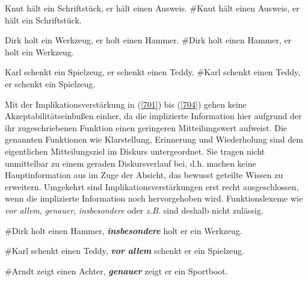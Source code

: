 \begin{exe}
	\ex\label{706} 
		\begin{xlist}	
			\ex\label{706a} Knut hält ein Schriftstück, er hält einen Ausweis.
			\ex\label{706b} \#Knut hält einen Ausweis, er hält ein Schriftstück.
		\end{xlist}
\end{exe}

\begin{exe}
	\ex\label{707} 
		\begin{xlist}	
			\ex\label{707a} Dirk holt ein Werkzeug, er holt einen Hammer.
			\ex\label{707b} \#Dirk holt einen Hammer, er holt ein Werkzeug.
		\end{xlist}
\end{exe}

\begin{exe}
	\ex\label{708} 
		\begin{xlist}	
			\ex\label{708a} Karl schenkt ein Spielzeug, er schenkt einen Teddy.
			\ex\label{708b} \#Karl schenkt einen Teddy, er schenkt ein Spielzeug.
		\end{xlist}
\end{exe}	
Mit der Implikationsverstärkung in (\ref{701}) bis (\ref{704}) gehen keine Akzeptabilitätseinbußen einher, da die implizierte Information hier aufgrund der ihr zugeschriebenen Funktion einen geringeren Mitteilungswert aufweist. Die genannten Funktionen wie Klarstellung, Erinnerung und Wiederholung sind dem eigentlichen Mitteilungsziel im Diskurs untergeordnet. Sie tragen nicht unmittelbar zu einem geraden Diskursverlauf bei, d.h. machen keine Hauptinformation aus im Zuge der Absicht, das bewusst geteilte Wissen zu erweitern. Umgekehrt sind Implikationsverstärkungen erst recht ausgeschlossen, wenn die implizierte Information noch hervorgehoben wird. Funktionslexeme wie \textit{vor allem}, \textit{genauer}, \textit{insbesondere} oder \textit{z.B.} sind deshalb nicht zulässig.

\begin{exe}
	\ex\label{709} 
	\#Dirk holt einen Hammer, \textbf{\textit{insbesondere}} holt er ein Werkzeug.
\end{exe}

\begin{exe}
	\ex\label{710} 
	\#Karl schenkt einen Teddy, \textbf{\textit{vor allem}} schenkt er ein Spielzeug.
\end{exe}

\begin{exe}
	\ex\label{711} 
	\#Arndt zeigt einen Achter, \textbf{\textit{genauer}} zeigt er ein Sportboot.
\end{exe}

